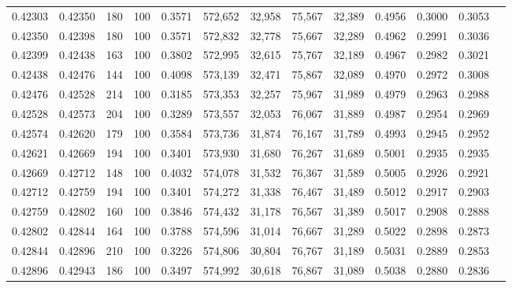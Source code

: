 \begin{tabular}{rrrrrrrrrrrrr}
0.42303 & 0.42350 &   180 & 100 &                                     0.3571 & 572,652 &  32,958 &  75,567 &  32,389 & 0.4956 & 0.3000 & 0.3053 \\
0.42350 & 0.42398 &   180 & 100 &                                     0.3571 & 572,832 &  32,778 &  75,667 &  32,289 & 0.4962 & 0.2991 & 0.3036 \\
0.42399 & 0.42438 &   163 & 100 &                                     0.3802 & 572,995 &  32,615 &  75,767 &  32,189 & 0.4967 & 0.2982 & 0.3021 \\
0.42438 & 0.42476 &   144 & 100 &                                     0.4098 & 573,139 &  32,471 &  75,867 &  32,089 & 0.4970 & 0.2972 & 0.3008 \\
0.42476 & 0.42528 &   214 & 100 &                                     0.3185 & 573,353 &  32,257 &  75,967 &  31,989 & 0.4979 & 0.2963 & 0.2988 \\
0.42528 & 0.42573 &   204 & 100 &                                     0.3289 & 573,557 &  32,053 &  76,067 &  31,889 & 0.4987 & 0.2954 & 0.2969 \\
0.42574 & 0.42620 &   179 & 100 &                                     0.3584 & 573,736 &  31,874 &  76,167 &  31,789 & 0.4993 & 0.2945 & 0.2952 \\
0.42621 & 0.42669 &   194 & 100 &                                     0.3401 & 573,930 &  31,680 &  76,267 &  31,689 & 0.5001 & 0.2935 & 0.2935 \\
0.42669 & 0.42712 &   148 & 100 &                                     0.4032 & 574,078 &  31,532 &  76,367 &  31,589 & 0.5005 & 0.2926 & 0.2921 \\
0.42712 & 0.42759 &   194 & 100 &                                     0.3401 & 574,272 &  31,338 &  76,467 &  31,489 & 0.5012 & 0.2917 & 0.2903 \\
0.42759 & 0.42802 &   160 & 100 &                                     0.3846 & 574,432 &  31,178 &  76,567 &  31,389 & 0.5017 & 0.2908 & 0.2888 \\
0.42802 & 0.42844 &   164 & 100 &                                     0.3788 & 574,596 &  31,014 &  76,667 &  31,289 & 0.5022 & 0.2898 & 0.2873 \\
0.42844 & 0.42896 &   210 & 100 &                                     0.3226 & 574,806 &  30,804 &  76,767 &  31,189 & 0.5031 & 0.2889 & 0.2853 \\
0.42896 & 0.42943 &   186 & 100 &                                     0.3497 & 574,992 &  30,618 &  76,867 &  31,089 & 0.5038 & 0.2880 & 0.2836 \\

\end{tabular}
